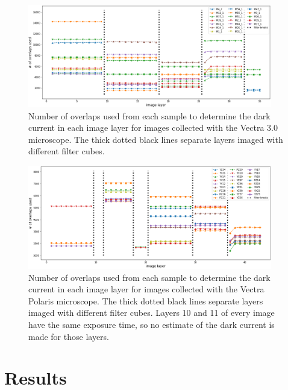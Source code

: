 \documentclass[letterpaper,11pt]{article}
\begin{document}
\begin{figure}[!ht]
\centering
\includegraphics[width=0.95\textwidth]{images/methods/n_overlaps_used_vectra}
\caption{\footnotesize Number of overlaps used from each sample to determine the dark current in each image layer for images collected with the Vectra 3.0 microscope. The thick dotted black lines separate layers imaged with different filter cubes.}
\label{fig:n_overlaps_used_vectra}
\end{figure}

\begin{figure}[!ht]
\centering
\includegraphics[width=0.95\textwidth]{images/methods/n_overlaps_used_polaris}
\caption{\footnotesize Number of overlaps used from each sample to determine the dark current in each image layer for images collected with the Vectra Polaris microscope. The thick dotted black lines separate layers imaged with different filter cubes. Layers 10 and 11 of every image have the same exposure time, so no estimate of the dark current is made for those layers. }
\label{fig:n_overlaps_used_polaris}
\end{figure}


\clearpage

\section{Results}
\label{sec:results}
\end{document}
